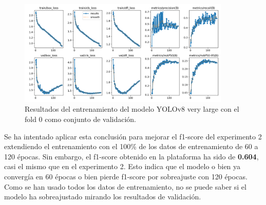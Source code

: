 \begin{figure}[H]
    \centering
    \includegraphics[width=0.9\textwidth]{img/exp2b-results.png}
    \caption{Resultados del entrenamiento del modelo YOLOv8 very large con el fold 0 como conjunto de validación.}
    \label{fig:exp2b-results}
\end{figure}

Se ha intentado aplicar esta conclusión para mejorar el f1-score del experimento 2 extendiendo el entrenamiento con el 100\% de los datos de entrenamiento de 60 a 120 épocas. Sin embargo, el f1-score obtenido en la plataforma ha sido de \textbf{0.604}, casi el mismo que en el experimento 2. Esto indica que el modelo o bien ya convergía en 60 épocas o bien pierde f1-score por sobreajuste con 120 épocas. Como se han usado todos los datos de entrenamiento, no se puede saber si el modelo ha sobreajustado mirando los resultados de validación.
